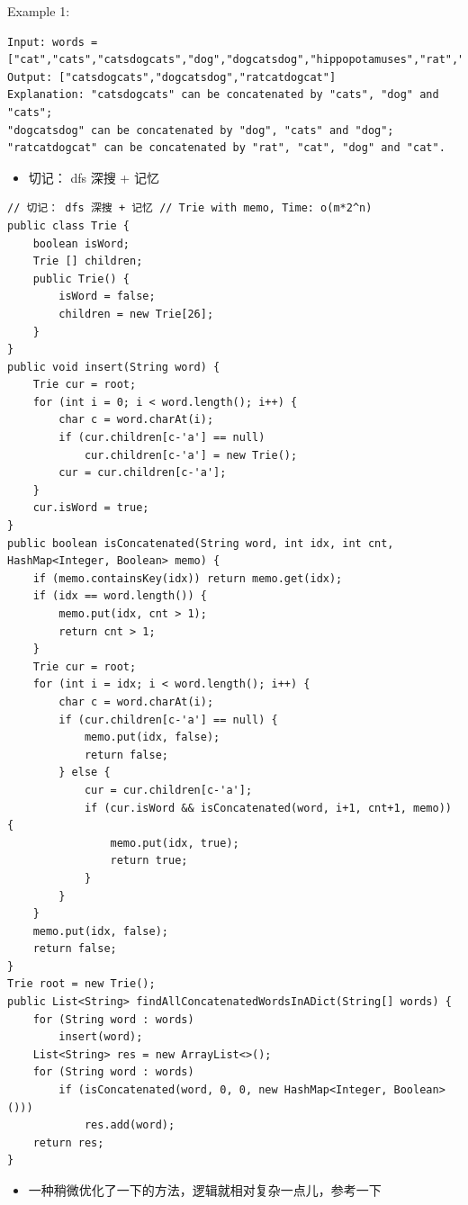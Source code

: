 \documentclass[9pt, b5paaper]{book}
\begin{document}
Example 1:
\begin{verbatim}
Input: words = ["cat","cats","catsdogcats","dog","dogcatsdog","hippopotamuses","rat","ratcatdogcat"]
Output: ["catsdogcats","dogcatsdog","ratcatdogcat"]
Explanation: "catsdogcats" can be concatenated by "cats", "dog" and "cats"; 
"dogcatsdog" can be concatenated by "dog", "cats" and "dog"; 
"ratcatdogcat" can be concatenated by "rat", "cat", "dog" and "cat".
\end{verbatim}
\begin{itemize}
\item 切记： dfs 深搜 + 记忆
\end{itemize}
\begin{verbatim}
// 切记： dfs 深搜 + 记忆 // Trie with memo, Time: o(m*2^n)
public class Trie { 
    boolean isWord;
    Trie [] children;
    public Trie() {
        isWord = false;
        children = new Trie[26];
    }
}
public void insert(String word) { 
    Trie cur = root;
    for (int i = 0; i < word.length(); i++) {
        char c = word.charAt(i);
        if (cur.children[c-'a'] == null)
            cur.children[c-'a'] = new Trie();
        cur = cur.children[c-'a'];
    }
    cur.isWord = true;
}     
public boolean isConcatenated(String word, int idx, int cnt, HashMap<Integer, Boolean> memo) {
    if (memo.containsKey(idx)) return memo.get(idx);
    if (idx == word.length()) {
        memo.put(idx, cnt > 1);
        return cnt > 1;
    }
    Trie cur = root;
    for (int i = idx; i < word.length(); i++) {
        char c = word.charAt(i);
        if (cur.children[c-'a'] == null) {
            memo.put(idx, false);
            return false;
        } else {
            cur = cur.children[c-'a'];
            if (cur.isWord && isConcatenated(word, i+1, cnt+1, memo)) {
                memo.put(idx, true);
                return true;
            }
        }
    }
    memo.put(idx, false);
    return false;
}
Trie root = new Trie();
public List<String> findAllConcatenatedWordsInADict(String[] words) {
    for (String word : words) 
        insert(word);
    List<String> res = new ArrayList<>();
    for (String word : words) 
        if (isConcatenated(word, 0, 0, new HashMap<Integer, Boolean>()))
            res.add(word);
    return res;
}
\end{verbatim}
\begin{itemize}
\item 一种稍微优化了一下的方法，逻辑就相对复杂一点儿，参考一下
\end{itemize}
\end{document}
